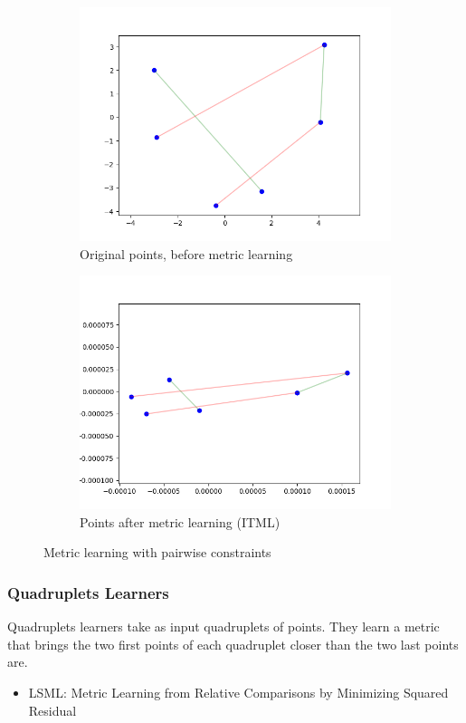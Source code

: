 \documentclass[twoside,11pt]{article}
\begin{document}
    \begin{figure}[H]
\centering
\begin{subfigure}{.5\textwidth}
  \centering
  \includegraphics[width=.8\linewidth]{pairs_without_metric.png}
  \caption{Original points, before metric learning}
  \label{fig:sub1}
\end{subfigure}%
\begin{subfigure}{.5\textwidth}
  \centering
  \includegraphics[width=.8\linewidth]{pairs_with_metric.png}
  \caption{Points after metric learning (ITML)}
  \label{fig:sub2}
\end{subfigure}
\caption{Metric learning with pairwise constraints}
\label{fig:test}
\end{figure}
    
    \subsubsection{Quadruplets Learners}
    Quadruplets learners take as input quadruplets of points. They learn a metric that brings the two first points of each quadruplet closer than the two last points are.
    \begin{itemize}
        \item LSML: Metric Learning from Relative Comparisons by Minimizing Squared Residual
    \end{itemize}
\end{document}
